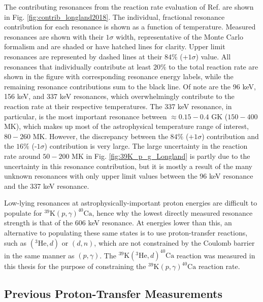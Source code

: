 The contributing resonances from the reaction rate evaluation of Ref. \cite{Longland2018} are shown in Fig. \ref{fig:contrib_longland2018}. The individual, fractional resonance contribution for each resonance is shown as a function of temperature. Measured resonances are shown with their $1\sigma$ width, representative of the Monte Carlo formalism \cite{Longland2010a} and are shaded or have hatched lines for clarity. Upper limit resonances are represented by dashed lines at their $84\%$ (+$1\sigma$) value. All resonances that individually contribute at least $20\%$ to the total reaction rate are shown in the figure with corresponding resonance energy labels, while the remaining resonance contributions sum to the black line. Of note are the 96 keV, 156 keV, and 337 keV resonances, which overwhelmingly contribute to the reaction rate at their respective temperatures. The 337 keV resonance, in particular, is the most important resonance between $\approx 0.15-0.4$ GK ($150-400$ MK), which makes up most of the astrophysical temperature range of interest, $80-260$ MK. However, the discrepancy between the $84\%$ ($+1\sigma$) contribution and the $16\%$ (-$1\sigma$) contribution is very large. The large uncertainty in the reaction rate around $50-200$ MK in Fig. \ref{fig:39K_p_g_Longland} is partly due to the uncertainty in this resonance contribution, but it is mostly a result of the many unknown resonances with only upper limit values between the 96 keV resonance and the 337 keV resonance.

Low-lying resonances at astrophysically-important proton energies are difficult to populate for $^{39}\mathrm{K}(p,\gamma)^{40}\mathrm{Ca}$, hence why the lowest directly measured resonance strength is that of the 606 keV resonance. At energies lower than this, an alternative to populating these same states is to use proton-transfer reactions, such as $(^{3}\mathrm{He},d)$ or $(d,n)$, which are not constrained by the Coulomb barrier in the same manner as $(p,\gamma)$. The $^{39}\mathrm{K}(^{3}\mathrm{He},d)^{40}\mathrm{Ca}$ reaction was measured in this thesis for the purpose of constraining the $^{39}\mathrm{K}(p,\gamma)^{40}\mathrm{Ca}$ reaction rate.

\subsection{Previous Proton-Transfer Measurements}

